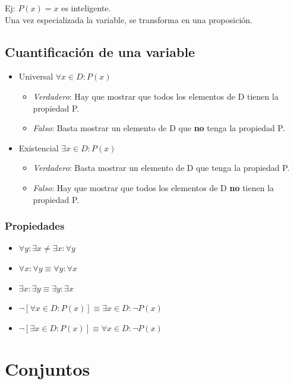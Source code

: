 Ej: $P(x) = x$ es inteligente.\\

Una vez especializada la variable, se transforma en una proposición.

\subsection{Cuantificación de una variable}
\begin{itemize}
	\item Universal $\forall x \in D: P(x)$
	\begin{itemize}
		\item \emph{Verdadero}: Hay que mostrar que todos los elementos de D tienen la propiedad P.
		\item \emph{Falso}: Basta mostrar un elemento de D que \textbf{no} tenga la propiedad P.
	\end{itemize}
	
	\item Existencial $\exists x \in D: P(x)$
	\begin{itemize}
		\item \emph{Verdadero}: Basta mostrar un elemento de D que tenga la propiedad P.
		\item \emph{Falso}: Hay que mostrar que todos los elementos de D \textbf{no} tienen la propiedad P.
	\end{itemize}
\end{itemize}

\subsubsection{Propiedades}
\begin{itemize}
	\item $\forall y: \exists x \neq \exists x: \forall y$
	\item $\forall x: \forall y \equiv \forall y: \forall x$
	\item $\exists x: \exists y \equiv \exists y: \exists x$
	\item $\neg\left[\forall x \in D: P(x)\right] \equiv \exists x \in D: \neg P(x)$
	\item $\neg\left[\exists x \in D: P(x)\right] \equiv \forall x \in D: \neg P(x)$
\end{itemize}

\newpage
\section{Conjuntos}
